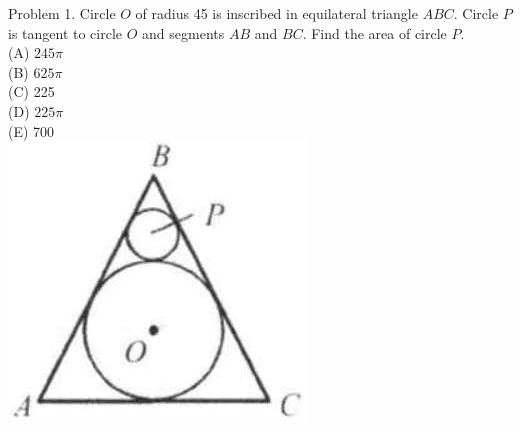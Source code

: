 \documentclass[10pt]{article}
\begin{document}
Problem 1. Circle \(O\) of radius 45 is inscribed in equilateral triangle \(A B C\). Circle \(P\) is tangent to circle \(O\) and segments \(A B\) and \(B C\). Find the area of circle \(P\).\\
(A) \(245 \pi\)\\
(B) \(625 \pi\)\\
(C) 225\\
(D) \(225 \pi\)\\
(E) 700\\
\includegraphics[max width=\textwidth, center]{2025_04_17_97bc1f7e44d93c271a88g-184}
\end{document}
